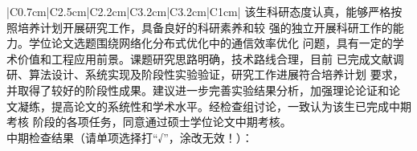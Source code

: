 \begin{titlepage}
\begin{center}
\begin{tabular}{|C{0.7cm}|C{2.5cm}|C{2.2cm}|C{3.2cm}|C{3.2cm}|C{1cm}|}
{{该生科研态度认真，能够严格按照培养计划开展研究工作，具备良好的科研素养和较
强的独立开展科研工作的能力。学位论文选题围绕网络化分布式优化中的通信效率优化
问题，具有一定的学术价值和工程应用前景。课题研究思路明确，技术路线合理，目前
已完成文献调研、算法设计、系统实现及阶段性实验验证，研究工作进展符合培养计划
要求，并取得了较好的阶段性成果。建议进一步完善实验结果分析，加强理论论证和论
文凝练，提高论文的系统性和学术水平。经检查组讨论，一致认为该生已完成中期考核
阶段的各项任务，同意通过硕士学位论文中期考核。
~~\\
中期检查结果（请单项选择打“√”，涂改无效！）：\\
~~\\
~~\\
~~\\

~~\\
\qquad{}
~~\\
\qquad\qquad{}
~~\\}} \\
\hline
\end{tabular}
\end{center}
\end{titlepage}
